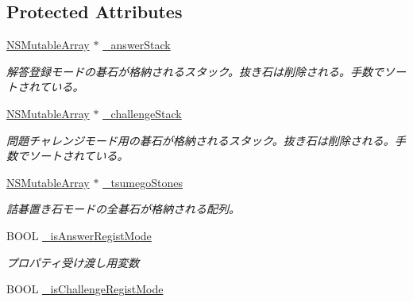 \subsection*{Protected Attributes}
\begin{DoxyCompactItemize}
\item 
\hypertarget{interface_tsumego_games_a708f1a303d6bf3c3119cf0dc1a064cf3}{
\hyperlink{class_n_s_mutable_array}{NSMutableArray} $\ast$ \hyperlink{interface_tsumego_games_a708f1a303d6bf3c3119cf0dc1a064cf3}{\_\-answerStack}}
\label{interface_tsumego_games_a708f1a303d6bf3c3119cf0dc1a064cf3}

\begin{DoxyCompactList}\small\item\em 解答登録モードの碁石が格納されるスタック。抜き石は削除される。手数でソートされている。 \end{DoxyCompactList}\item 
\hypertarget{interface_tsumego_games_a10f9ca0718f781a64c83cf12b3f2e43a}{
\hyperlink{class_n_s_mutable_array}{NSMutableArray} $\ast$ \hyperlink{interface_tsumego_games_a10f9ca0718f781a64c83cf12b3f2e43a}{\_\-challengeStack}}
\label{interface_tsumego_games_a10f9ca0718f781a64c83cf12b3f2e43a}

\begin{DoxyCompactList}\small\item\em 問題チャレンジモード用の碁石が格納されるスタック。抜き石は削除される。手数でソートされている。 \end{DoxyCompactList}\item 
\hypertarget{interface_tsumego_games_a7bb7466a652e1f1d691f5c031367ff72}{
\hyperlink{class_n_s_mutable_array}{NSMutableArray} $\ast$ \hyperlink{interface_tsumego_games_a7bb7466a652e1f1d691f5c031367ff72}{\_\-tsumegoStones}}
\label{interface_tsumego_games_a7bb7466a652e1f1d691f5c031367ff72}

\begin{DoxyCompactList}\small\item\em 詰碁置き石モードの全碁石が格納される配列。 \end{DoxyCompactList}\item 
\hypertarget{interface_tsumego_games_ad99d8683a35ed1a8fdd0f0692719dc5e}{
BOOL \hyperlink{interface_tsumego_games_ad99d8683a35ed1a8fdd0f0692719dc5e}{\_\-isAnswerRegistMode}}
\label{interface_tsumego_games_ad99d8683a35ed1a8fdd0f0692719dc5e}

\begin{DoxyCompactList}\small\item\em プロパティ受け渡し用変数 \end{DoxyCompactList}\item 
\hypertarget{interface_tsumego_games_a8059053c1ff4394f8bceb8a707d5daf6}{
BOOL \hyperlink{interface_tsumego_games_a8059053c1ff4394f8bceb8a707d5daf6}{\_\-isChallengeRegistMode}}
\label{interface_tsumego_games_a8059053c1ff4394f8bceb8a707d5daf6}


\end{DoxyCompactItemize}
